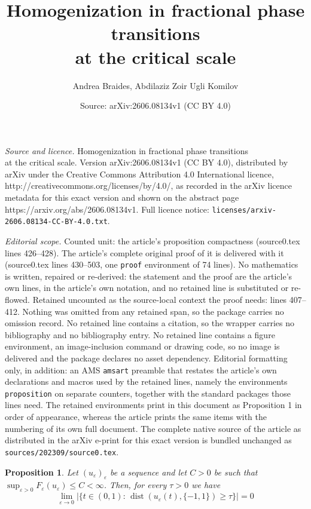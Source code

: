\documentclass[10pt,a4paper]{amsart}
\title{Homogenization in fractional phase transitions \\ at the critical scale}
\author{Andrea Braides, Abdilaziz Zoir Ugli Komilov}
\date{Source: arXiv:2606.08134v1 (CC BY 4.0)}
\newtheorem{proposition}{Proposition}
\begin{document}
\maketitle

\noindent\emph{Source and licence.} Homogenization in fractional phase transitions \\ at the critical scale. Version arXiv:2606.08134v1 (CC BY 4.0), distributed by arXiv under the Creative Commons Attribution 4.0 International licence, http://creativecommons.org/licenses/by/4.0/, as recorded in the arXiv licence metadata for this exact version and shown on the abstract page https://arxiv.org/abs/2606.08134v1. Full licence notice: \texttt{licenses/arxiv-2606.08134-CC-BY-4.0.txt}.\par\smallskip

\noindent\textit{Editorial scope.} Counted unit: the article's proposition compactness (source0.tex lines 426--428). The article's complete original proof of it is delivered with it (source0.tex lines 430--503, one \texttt{proof} environment of 74 lines). No mathematics is written, repaired or re-derived: the statement and the proof are the article's own lines, in the article's own notation, and no retained line is substituted or re-flowed.  Retained uncounted as the source-local context the proof needs: lines 407--412.  Nothing was omitted from any retained span, so the package carries no omission record.  No retained line contains a citation, so the wrapper carries no bibliography and no bibliography entry.  No retained line contains a figure environment, an image-inclusion command or drawing code, so no image is delivered and the package declares no asset dependency.  Editorial formatting only, in addition: an AMS \texttt{amsart} preamble that restates the article's own declarations and macros used by the retained lines, namely the environments \texttt{proposition} on separate counters, together with the standard packages those lines need.  The retained environments print in this document as Proposition 1 in order of appearance, whereas the article prints the same items with the numbering of its own full document.  The complete native source of the article as distributed in the arXiv e-print for this exact version is bundled unchanged as \texttt{sources/202309/source0.tex}.
\begin{proposition}\label{convergence in measure}
   Let $(u_{\varepsilon})_{\varepsilon}$ be a sequence and let $C>0$ be such that $\sup_{\varepsilon>0}F_{\varepsilon}(u_{\varepsilon})\le C<\infty$. Then, for every $\tau>0$ we have
\[
\lim_{\varepsilon\to0}|\{t\in(0,1):\,\operatorname{dist}(u_{\varepsilon}(t),\{-1,1\})\ge\tau\}|=0
\]
\end{proposition}
\end{document}
